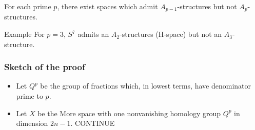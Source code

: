 \documentclass{beamer}
\theoremstyle{definition}
\begin{document}
\begin{frame}[fragile]
\begin{theorem}
For each prime $p$, there exist spaces which admit $A_{p-1}$-structures but not $A_p$-structures.
\end{theorem}\pause
\begin{block}{Example}
For $p=3$, $S^7$ admits an $A_2$-structures (H-space) but not an $A_3$-structure.
\end{block}
\end{frame}
\begin{frame}
\frametitle{Sketch of the proof}
\begin{itemize}
\item<1-> Let $Q^p$ be the group of fractions which, in lowest terms, have denominator prime to $p$.
\item<2-> Let $X$ be the More space with one nonvanishing homology group $Q^p$ in dimension $2n-1$.
CONTINUE
\end{itemize}
\end{frame}
\end{document}
